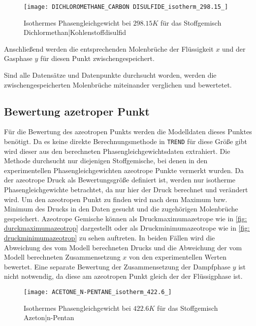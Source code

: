 \documentclass[../thesis.tex]{subfiles}
\begin{document}
\begin{figure}[htb]
	\centering
	\texttt{[image: DICHLOROMETHANE\_CARBON DISULFIDE\_isotherm\_298.15\_]}
	\caption{Isothermes Phasengleichgewicht bei $ 298.15 K$ für das Stoffgemisch Dichlormethan|Kohlenstoffdisulfid}
	\label{fig: phase_eq_datenausschluss}
\end{figure}

Anschließend werden die entsprechenden Molenbrüche der Flüssigkeit $x$ und der Gasphase $y$ für diesen Punkt zwischengespeichert.

Sind alle Datensätze und Datenpunkte durchsucht worden, werden die zwischengespeicherten Molenbrüche miteinander verglichen und bewertetet.

\subsection{Bewertung azetroper Punkt}

Für die Bewertung des azeotropen Punkts werden die Modelldaten dieses Punktes benötigt. Da es keine direkte Berechnungsmethode in \texttt{TREND} für diese Größe gibt wird dieser aus den berechneten Phasengleichgewichtsdaten extrahiert. Die Methode durchsucht nur diejenigen Stoffgemische, bei denen in den experimentellen Phasengleichgewichten azeotrope Punkte vermerkt wurden. Da der azeotrope Druck als Bewertungsgröße definiert ist, werden nur isotherme Phasengleichgewichte betrachtet, da nur hier der Druck berechnet und verändert wird. Um den azeotropen Punkt zu finden wird nach dem Maximum bzw. Minimum des Drucks in den Daten gesucht und die zugehörigen Molenbrüche gespeichert. Azeotrope Gemische können als Druckmaximumazetrope wie in \autoref{fig: durckmaximumazeotrop} dargestellt oder als Druckminimumazeotrope wie in \autoref{fig: druckminimumazeotrop} zu sehen auftreten. In beiden Fällen wird die Abweichung des vom Modell berechneten Drucks und die Abweichung der vom Modell berechneten Zusammensetzung $x$ von den experimentellen Werten bewertet. Eine separate Bewertung der Zusammensetzung der Dampfphase $y$ ist nicht notwendig, da diese am azeotropen Punkt gleich der der Flüssigphase ist. 

\begin{figure}[htb]
	\centering
	\texttt{[image: ACETONE\_N-PENTANE\_isotherm\_422.6\_]}
	\caption{Isothermes Phasengleichgewicht bei $ 422.6 K$ für das Stoffgemisch Azeton|n-Pentan}
	\label{fig: durckmaximumazeotrop}
\end{figure}
\end{document}
